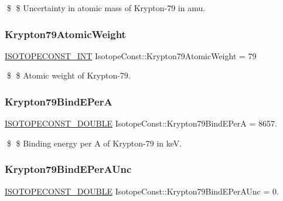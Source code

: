 \$ \$ Uncertainty in atomic mass of Krypton-\/79 in amu. \mbox{\label{group___isotope_const-_krypton-_kr79_gab88821a95db6c33905ff751b82e9f9f1}} 
\subsubsection{\texorpdfstring{Krypton79\+Atomic\+Weight}{Krypton79AtomicWeight}}
{\footnotesize\ttfamily \mbox{\hyperlink{group___isotope_const-_macros_ga5f18360b3e99483a35c32d789e62621c}{I\+S\+O\+T\+O\+P\+E\+C\+O\+N\+S\+T\+\_\+\+I\+NT}} Isotope\+Const\+::\+Krypton79\+Atomic\+Weight = 79}

\$ \$ Atomic weight of Krypton-\/79. \mbox{\label{group___isotope_const-_krypton-_kr79_ga3200b91d6357e9d03cdecb37ec072bb1}} 
\subsubsection{\texorpdfstring{Krypton79\+Bind\+E\+PerA}{Krypton79BindEPerA}}
{\footnotesize\ttfamily \mbox{\hyperlink{group___isotope_const-_macros_ga8f45a7272ce02c0b4c65c44636ed719a}{I\+S\+O\+T\+O\+P\+E\+C\+O\+N\+S\+T\+\_\+\+D\+O\+U\+B\+LE}} Isotope\+Const\+::\+Krypton79\+Bind\+E\+PerA = 8657.}

\$ \$ Binding energy per A of Krypton-\/79 in keV. \mbox{\label{group___isotope_const-_krypton-_kr79_gaea1c711aed1fe314a95b2fa5382827c5}} 
\subsubsection{\texorpdfstring{Krypton79\+Bind\+E\+Per\+A\+Unc}{Krypton79BindEPerAUnc}}
{\footnotesize\ttfamily \mbox{\hyperlink{group___isotope_const-_macros_ga8f45a7272ce02c0b4c65c44636ed719a}{I\+S\+O\+T\+O\+P\+E\+C\+O\+N\+S\+T\+\_\+\+D\+O\+U\+B\+LE}} Isotope\+Const\+::\+Krypton79\+Bind\+E\+Per\+A\+Unc = 0.}


